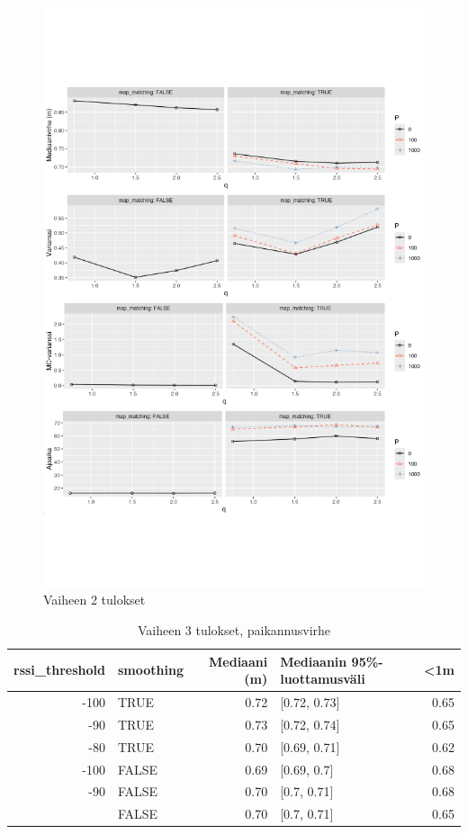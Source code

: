 \documentclass[
  12pt,
  a4paper, twoside]{book}
\begin{document}
\begin{figure}[H]
\centering
\includegraphics[width=15cm]{phase2_results_vertical_safe}
\caption{Vaiheen 2 tulokset}
\label{fig:phase2_results}
\end{figure}

\begin{table}

\caption{\label{tab:vaihe-3-tulokset}Vaiheen 3 tulokset, paikannusvirhe}
\centering
\begin{tabular}[t]{rlrlr}
\toprule
rssi\_threshold & smoothing & Mediaani (m) & Mediaanin 95\%-luottamusväli & <1m\\
\midrule
-100 & TRUE & 0.72 & {}[0.72, 0.73] & 0.65\\
-90 & TRUE & 0.73 & {}[0.72, 0.74] & 0.65\\
-80 & TRUE & 0.70 & {}[0.69, 0.71] & 0.62\\
-100 & FALSE & 0.69 & {}[0.69, 0.7] & 0.68\\
-90 & FALSE & 0.70 & {}[0.7, 0.71] & 0.68\\
\addlinespace
-80 & FALSE & 0.70 & {}[0.7, 0.71] & 0.65\\
\bottomrule
\end{tabular}
\end{table}
\end{document}
